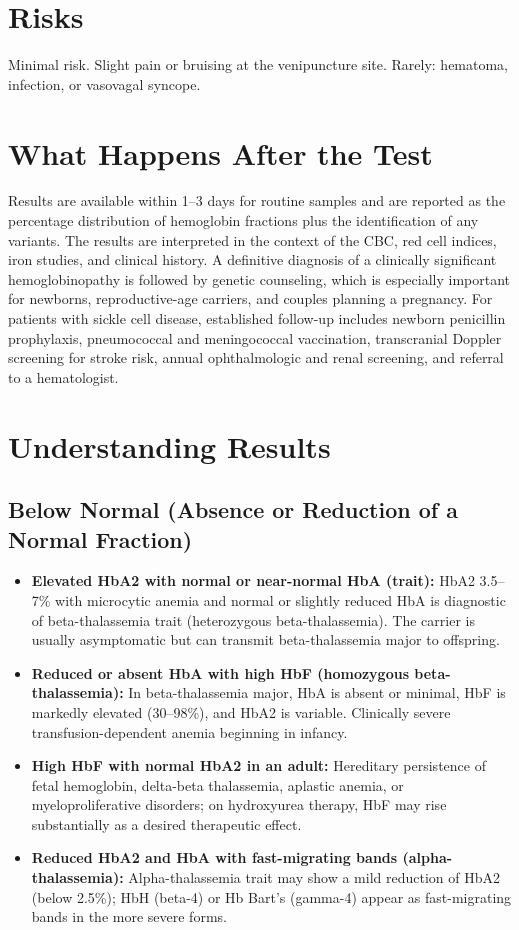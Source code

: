 \section*{Risks}
Minimal risk. Slight pain or bruising at the venipuncture site. Rarely: hematoma, infection, or vasovagal syncope.

\section*{What Happens After the Test}
Results are available within 1--3 days for routine samples and are reported as the percentage distribution of hemoglobin fractions plus the identification of any variants. The results are interpreted in the context of the CBC, red cell indices, iron studies, and clinical history. A definitive diagnosis of a clinically significant hemoglobinopathy is followed by genetic counseling, which is especially important for newborns, reproductive-age carriers, and couples planning a pregnancy. For patients with sickle cell disease, established follow-up includes newborn penicillin prophylaxis, pneumococcal and meningococcal vaccination, transcranial Doppler screening for stroke risk, annual ophthalmologic and renal screening, and referral to a hematologist.

\section*{Understanding Results}

\subsection*{Below Normal (Absence or Reduction of a Normal Fraction)}
\begin{itemize}
  \item \textbf{Elevated HbA2 with normal or near-normal HbA (trait):} HbA2 3.5--7\% with microcytic anemia and normal or slightly reduced HbA is diagnostic of beta-thalassemia trait (heterozygous beta-thalassemia). The carrier is usually asymptomatic but can transmit beta-thalassemia major to offspring.
  \item \textbf{Reduced or absent HbA with high HbF (homozygous beta-thalassemia):} In beta-thalassemia major, HbA is absent or minimal, HbF is markedly elevated (30--98\%), and HbA2 is variable. Clinically severe transfusion-dependent anemia beginning in infancy.
  \item \textbf{High HbF with normal HbA2 in an adult:} Hereditary persistence of fetal hemoglobin, delta-beta thalassemia, aplastic anemia, or myeloproliferative disorders; on hydroxyurea therapy, HbF may rise substantially as a desired therapeutic effect.
  \item \textbf{Reduced HbA2 and HbA with fast-migrating bands (alpha-thalassemia):} Alpha-thalassemia trait may show a mild reduction of HbA2 (below 2.5\%); HbH (beta-4) or Hb Bart's (gamma-4) appear as fast-migrating bands in the more severe forms.
\end{itemize}

